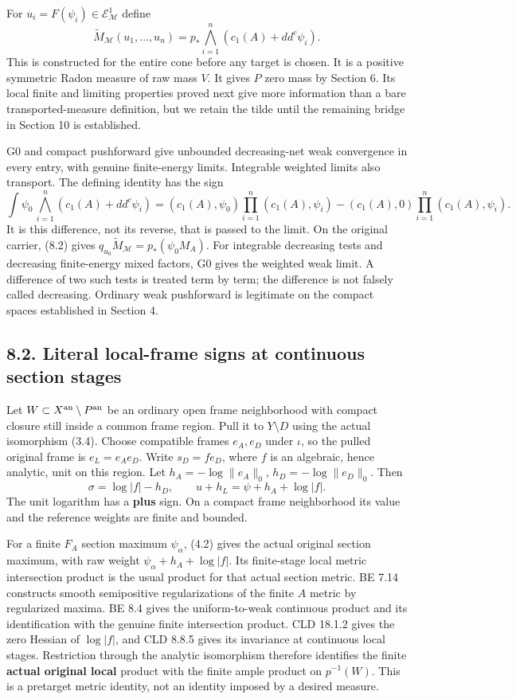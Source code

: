 \documentclass[
  10pt,
]{article}
\begin{document}
For \(u_i=F(\psi_i)\in\mathcal E^1_{\mathcal M}\) define
\[\widetilde M_{\mathcal M}(u_1,\ldots,u_n)
=p_*\bigwedge_{i=1}^n(c_1(A)+dd^c\psi_i).                \tag{8.1}\]
This is constructed for the entire cone before any target is chosen. It
is a positive symmetric Radon measure of raw mass \(V\). It gives \(P\)
zero mass by Section 6. Its local finite and limiting properties proved
next give more information than a bare transported-measure definition,
but we retain the tilde until the remaining bridge in Section 10 is
established.

G0 and compact pushforward give unbounded decreasing-net weak
convergence in every entry, with genuine finite-energy limits.
Integrable weighted limits also transport. The defining identity has the
sign \[\int\psi_0\,\bigwedge_{i=1}^n(c_1(A)+dd^c\psi_i)
=(c_1(A),\psi_0)\prod_{i=1}^n(c_1(A),\psi_i)
-(c_1(A),0)\prod_{i=1}^n(c_1(A),\psi_i).                 \tag{8.2}\] It
is this difference, not its reverse, that is passed to the limit. On the
original carrier, (8.2) gives
\(q_{u_0}\widetilde M_{\mathcal M}=p_*(\psi_0 M_A)\). For integrable
decreasing tests and decreasing finite-energy mixed factors, G0 gives
the weighted weak limit. A difference of two such tests is treated term
by term; the difference is not falsely called decreasing. Ordinary weak
pushforward is legitimate on the compact spaces established in Section
4.

\subsection{8.2. Literal local-frame signs at continuous section
stages}\label{literal-local-frame-signs-at-continuous-section-stages}

Let \(W\subset X^{\rm an}\setminus P^{\rm an}\) be an ordinary open
frame neighborhood with compact closure still inside a common frame
region. Pull it to \(Y\setminus D\) using the actual isomorphism (3.4).
Choose compatible frames \(e_A,e_D\) under \(\iota\), so the pulled
original frame is \(e_L=e_Ae_D\). Write \(s_D=f e_D\), where \(f\) is an
algebraic, hence analytic, unit on this region. Let
\(h_A=-\log\|e_A\|_0\), \(h_D=-\log\|e_D\|_0\). Then
\[\sigma=\log|f|-h_D,\qquad
u+h_L=\psi+h_A+\log|f|.                                \tag{8.3}\] The
unit logarithm has a \textbf{plus} sign. On a compact frame neighborhood
its value and the reference weights are finite and bounded.

For a finite \(F_A\) section maximum \(\psi_\alpha\), (4.2) gives the
actual original section maximum, with raw weight
\(\psi_\alpha+h_A+\log|f|\). Its finite-stage local metric intersection
product is the usual product for that actual section metric. BE 7.14
constructs smooth semipositive regularizations of the finite \(A\)
metric by regularized maxima. BE 8.4 gives the uniform-to-weak
continuous product and its identification with the genuine finite
intersection product. CLD 18.1.2 gives the zero Hessian of \(\log|f|\),
and CLD 8.8.5 gives its invariance at continuous local stages.
Restriction through the analytic isomorphism therefore identifies the
finite \textbf{actual original local} product with the finite ample
product on \(p^{-1}(W)\). This is a pretarget metric identity, not an
identity imposed by a desired measure.
\end{document}
